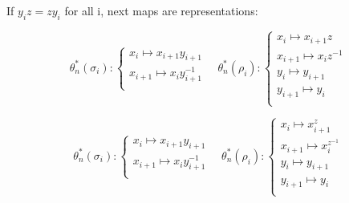 \documentclass{article}
\begin{document}
If $y_i z = z y_i$ for all i, next maps are representations:



\begin{equation}\label{defGV}

\theta_n^*(\sigma_i):

\begin{cases}

x_i \mapsto x_{i+1}y_{i+1}\\

x_{i+1} \mapsto x_iy_{i+1}^{-1}\\

\end{cases}\quad

\theta_n^*(\rho_i):

\begin{cases}

x_i \mapsto x_{i+1}z\\

x_{i+1} \mapsto x_iz^{-1}\\

y_i \mapsto y_{i+1}\\

y_{i+1} \mapsto y_i\\

\end{cases}

\end{equation}



\begin{equation}\label{defGV}
\theta_n^*(\sigma_i):

\begin{cases}

x_i \mapsto x_{i+1}y_{i+1}\\

x_{i+1} \mapsto x_iy_{i+1}^{-1}\\

\end{cases}\quad

\theta_n^*(\rho_i):

\begin{cases}

x_i \mapsto x_{i+1}^z\\

x_{i+1} \mapsto x_i^{z^{-1}}\\

y_i \mapsto y_{i+1}\\

y_{i+1} \mapsto y_i\\

\end{cases}
\end{equation}
\end{document}
